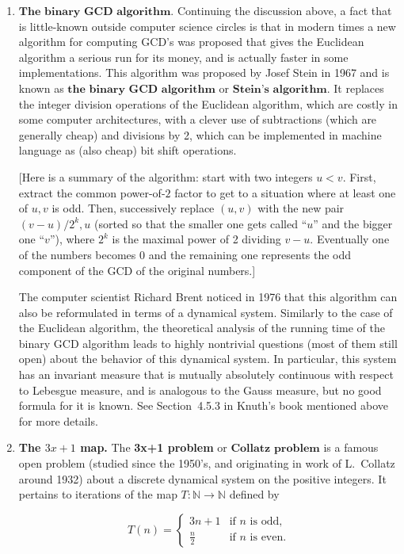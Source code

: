 \documentclass[11pt]{report}
\newcommand{\N}{\mathbb{N}}
\theoremstyle{plain}
\theoremstyle{definition}
\begin{document}
\begin{enumerate}[label=\arabic*.]
\item $\textbf{The binary GCD algorithm.}$ Continuing the
discussion above, a fact that is little-known outside
computer science circles is that in modern times a new
algorithm for computing GCD's was proposed that gives
the Euclidean algorithm a serious run for its money,
and is actually faster in some implementations. This
algorithm was proposed by Josef Stein in 1967 and is
known as $\textbf{the binary GCD algorithm}$ or
$\textbf{Stein's algorithm}$. It replaces the integer
division operations of the Euclidean algorithm, which
are costly in some computer architectures, with a
clever use of subtractions (which are generally cheap)
and divisions by 2, which can be implemented in
machine language as (also cheap) bit shift operations.

[Here is a summary of the algorithm: start with two
integers $u<v$. First, extract the common power-of-$2$
factor to get to a situation where at least one of
$u,v$ is odd. Then, successively replace $(u,v)$ with
the new pair $(v-u)/2^k,u$ (sorted so that the
smaller one gets called ``$u$'' and the bigger one
``$v$''), where $2^k$ is the maximal power of 2
dividing $v-u$. Eventually one of the numbers becomes
$0$ and the remaining one represents the odd
component of the GCD of the original numbers.]

The computer scientist Richard Brent noticed in 1976
that this algorithm can also be reformulated in terms
of a dynamical system. Similarly to the case of the
Euclidean algorithm, the theoretical analysis of the
running time of the binary GCD algorithm leads to
highly nontrivial questions (most of them still open)
about the behavior of this dynamical system. In
particular, this system has an invariant measure that
is mutually absolutely continuous with respect to
Lebesgue measure, and is analogous to the Gauss
measure, but no good formula for it is known. See
Section~4.5.3 in Knuth's book mentioned above for more
details.

\item \textbf{The $3x+1$ map.} The \textbf{3x+1 problem} or
$\textbf{Collatz problem}$ is a famous open problem
(studied since the 1950's, and originating in work of
L.~Collatz around 1932) about a discrete dynamical
system on the positive integers. It pertains to
iterations of the map $T:\N\to\N$ defined by

\[
T(n) = \begin{cases} 3n+1 & \textrm{if $n$ is odd}, \\ \frac{\displaystyle n}{\displaystyle 2} & \textrm{if $n$ is even}.
\end{cases}
\]


\end{enumerate}
\end{document}
